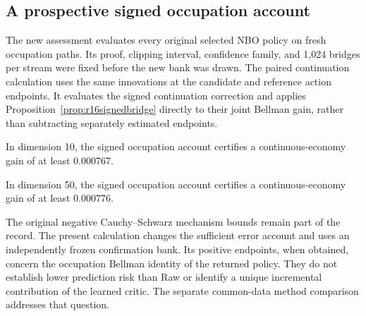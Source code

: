 \subsection{A prospective signed occupation account}
\label{sec:r16signedevidence}
The new assessment evaluates every original selected NBO policy on fresh
occupation paths. Its proof, clipping interval, confidence family, and 1,024
bridges per stream were fixed before the new bank was drawn. The paired
continuation calculation uses the same innovations at the candidate and
reference action endpoints. It evaluates the signed continuation correction
and applies Proposition~\ref{prop:r16signedbridge} directly to their joint
Bellman gain, rather than subtracting separately estimated endpoints.



In dimension 10, the signed occupation account certifies a continuous-economy gain of at least 0.000767.

In dimension 50, the signed occupation account certifies a continuous-economy gain of at least 0.000776.

The original negative Cauchy--Schwarz mechanism bounds remain part of the
record. The present calculation changes the sufficient error account and uses
an independently frozen confirmation bank. Its positive endpoints, when
obtained, concern the occupation Bellman identity of the returned policy.
They do not establish lower prediction risk than Raw or identify a unique
incremental contribution of the learned critic. The separate common-data
method comparison addresses that question.
